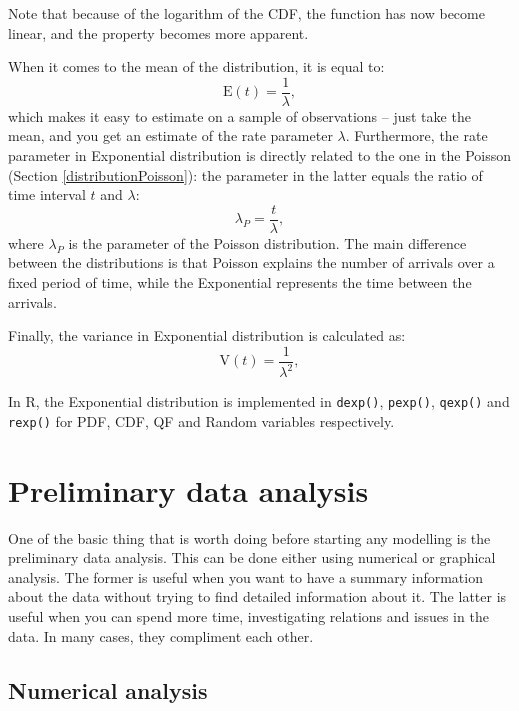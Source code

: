 \documentclass[
]{book}
\theoremstyle{definition}
\theoremstyle{definition}
\theoremstyle{definition}
\theoremstyle{definition}
\theoremstyle{remark}
\begin{document}
Note that because of the logarithm of the CDF, the function has now become linear, and the property becomes more apparent.

When it comes to the mean of the distribution, it is equal to:
\begin{equation}
    \mathrm{E}(t) = \frac{1}{\lambda},
    \label{eq:ExponentialMean}
\end{equation}
which makes it easy to estimate on a sample of observations -- just take the mean, and you get an estimate of the rate parameter \(\lambda\). Furthermore, the rate parameter in Exponential distribution is directly related to the one in the Poisson (Section \ref{distributionPoisson}): the parameter in the latter equals the ratio of time interval \(t\) and \(\lambda\):
\begin{equation}
    \lambda_P = \frac{t}{\lambda},
    \label{eq:ExponentialLambdaPoisson}
\end{equation}
where \(\lambda_P\) is the parameter of the Poisson distribution. The main difference between the distributions is that Poisson explains the number of arrivals over a fixed period of time, while the Exponential represents the time between the arrivals.

Finally, the variance in Exponential distribution is calculated as:
\begin{equation}
    \mathrm{V}(t) = \frac{1}{\lambda^2},
    \label{eq:ExponentialVariance}
\end{equation}

In R, the Exponential distribution is implemented in \texttt{dexp()}, \texttt{pexp()}, \texttt{qexp()} and \texttt{rexp()} for PDF, CDF, QF and Random variables respectively.

\hypertarget{dataAnalysis}{%
\chapter{Preliminary data analysis}\label{dataAnalysis}}

One of the basic thing that is worth doing before starting any modelling is the preliminary data analysis. This can be done either using numerical or graphical analysis. The former is useful when you want to have a summary information about the data without trying to find detailed information about it. The latter is useful when you can spend more time, investigating relations and issues in the data. In many cases, they compliment each other.

\hypertarget{dataAnalysisNumerical}{%
\section{Numerical analysis}\label{dataAnalysisNumerical}}
\end{document}
